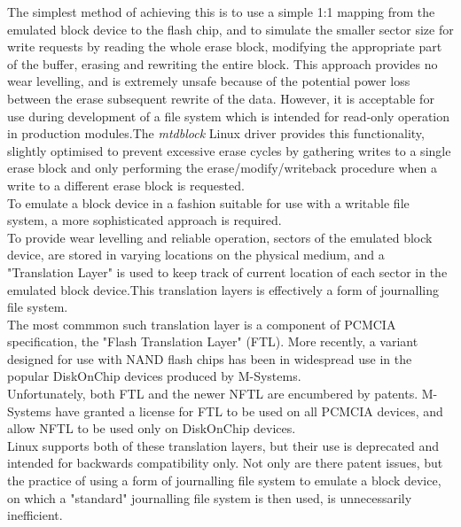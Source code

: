 \documentclass[conference]{IEEEtran}
\begin{document}
The simplest method of achieving this is to use a simple 1:1 mapping from the emulated
block device to the flash chip, and to simulate the smaller sector size for write requests
by reading the whole erase block, modifying the appropriate part of the buffer, erasing and rewriting
the entire block. This approach provides no wear levelling, and is extremely unsafe 
because of the potential power loss between the erase subsequent rewrite of the data.
However, it is acceptable for use during development of a file system which is intended
for read-only operation in production modules.The {\em mtdblock} Linux driver provides this 
functionality, slightly optimised to prevent excessive erase cycles by gathering writes
to a single erase block and only performing the erase/modify/writeback procedure when a 
write to a different erase block is requested. \\

To emulate a block device in a fashion suitable for use with a writable file system, 
a more sophisticated approach is required. \\

To provide wear levelling and reliable operation, sectors of the emulated block device,
are stored in varying locations on the physical medium, and a "Translation Layer" is used
to keep track of current location of each sector in the emulated block device.This 
translation layers is effectively a form of journalling file system. \\

The most commmon such translation layer is a component of PCMCIA specification, the "Flash
Translation Layer" (FTL). More recently, a variant designed for use with NAND flash chips has been
in widespread use in the popular DiskOnChip devices produced by M-Systems. \\

Unfortunately, both FTL and the newer NFTL are encumbered by patents. M-Systems have granted
a license for FTL to be used on all PCMCIA devices, and allow NFTL to be used only on     
DiskOnChip devices. \\

Linux supports both of these translation layers, but their use is deprecated and intended for 
backwards compatibility only. Not only are there patent issues, but the practice of 
using a form of journalling file system to emulate a block device, on which a "standard"
journalling file system is then used, is unnecessarily inefficient. \\
\end{document}
